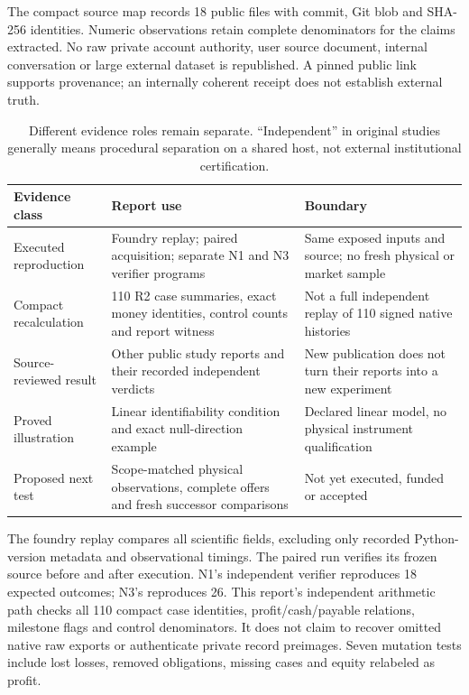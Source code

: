 \documentclass[11pt,letterpaper]{article}
\begin{document}
The compact source map records 18 public files with commit, Git blob and SHA-256 identities. Numeric observations retain complete denominators for the claims extracted. No raw private account authority, user source document, internal conversation or large external dataset is republished. A pinned public link supports provenance; an internally coherent receipt does not establish external truth.

\begin{table}[htbp]\centering\small
\begin{tabularx}{\linewidth}{@{}P{3.0cm}YY@{}}\toprule
Evidence class & Report use & Boundary\\\midrule
Executed reproduction & Foundry replay; paired acquisition; separate N1 and N3 verifier programs & Same exposed inputs and source; no fresh physical or market sample\\
Compact recalculation & 110 R2 case summaries, exact money identities, control counts and report witness & Not a full independent replay of 110 signed native histories\\
Source-reviewed result & Other public study reports and their recorded independent verdicts & New publication does not turn their reports into a new experiment\\
Proved illustration & Linear identifiability condition and exact null-direction example & Declared linear model, no physical instrument qualification\\
Proposed next test & Scope-matched physical observations, complete offers and fresh successor comparisons & Not yet executed, funded or accepted\\\bottomrule
\end{tabularx}
\caption{Different evidence roles remain separate. ``Independent'' in original studies generally means procedural separation on a shared host, not external institutional certification.}\label{tab:classes}
\end{table}

The foundry replay compares all scientific fields, excluding only recorded Python-version metadata and observational timings. The paired run verifies its frozen source before and after execution. N1's independent verifier reproduces 18 expected outcomes; N3's reproduces 26. This report's independent arithmetic path checks all 110 compact case identities, profit/cash/payable relations, milestone flags and control denominators. It does not claim to recover omitted native raw exports or authenticate private record preimages. Seven mutation tests include lost losses, removed obligations, missing cases and equity relabeled as profit.
\end{document}
